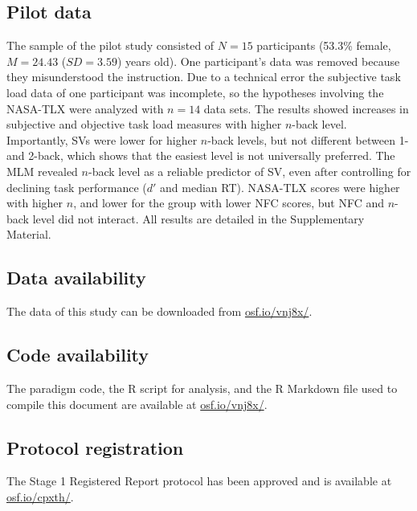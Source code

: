 \documentclass[
  man,floatsintext]{apa6}
\begin{document}
\hypertarget{pilot-data}{%
\subsection{Pilot data}\label{pilot-data}}

The sample of the pilot study consisted of \(N=15\) participants (53.3\% female, \(M=24.43\) (\(SD=3.59\)) years old).
One participant's data was removed because they misunderstood the instruction.
Due to a technical error the subjective task load data of one participant was incomplete, so the hypotheses involving the NASA-TLX were analyzed with \(n=14\) data sets.
The results showed increases in subjective and objective task load measures with higher \(n\)-back level.
Importantly, SVs were lower for higher \(n\)-back levels, but not different between 1- and 2-back, which shows that the easiest level is not universally preferred.
The MLM revealed \(n\)-back level as a reliable predictor of SV, even after controlling for declining task performance (\(d'\) and median RT).
NASA-TLX scores were higher with higher \(n\), and lower for the group with lower NFC scores, but NFC and \(n\)-back level did not interact.
All results are detailed in the Supplementary Material.

\hypertarget{data-availability}{%
\subsection{Data availability}\label{data-availability}}

The data of this study can be downloaded from \href{https://osf.io/vnj8x/}{osf.io/vnj8x/}.

\hypertarget{code-availability}{%
\subsection{Code availability}\label{code-availability}}

The paradigm code, the R script for analysis, and the R Markdown file used to compile this document are available at \href{https://osf.io/vnj8x/}{osf.io/vnj8x/}.

\hypertarget{protocol-registration}{%
\subsection{Protocol registration}\label{protocol-registration}}

The Stage 1 Registered Report protocol has been approved and is available at \href{https://osf.io/cpxth}{osf.io/cpxth/}.
\end{document}
